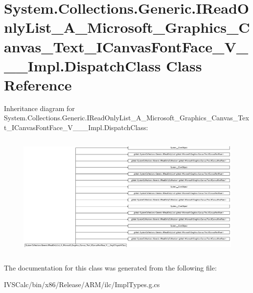 \hypertarget{class_system_1_1_collections_1_1_generic_1_1_i_read_only_list___a___microsoft___graphics___canva08bb27ae196fdbdd8fbb8b2645f26e4e}{}\section{System.\+Collections.\+Generic.\+I\+Read\+Only\+List\+\_\+\+A\+\_\+\+Microsoft\+\_\+\+Graphics\+\_\+\+Canvas\+\_\+\+Text\+\_\+\+I\+Canvas\+Font\+Face\+\_\+\+V\+\_\+\+\_\+\+\_\+\+Impl.\+Dispatch\+Class Class Reference}
\label{class_system_1_1_collections_1_1_generic_1_1_i_read_only_list___a___microsoft___graphics___canva08bb27ae196fdbdd8fbb8b2645f26e4e}
Inheritance diagram for System.\+Collections.\+Generic.\+I\+Read\+Only\+List\+\_\+\+A\+\_\+\+Microsoft\+\_\+\+Graphics\+\_\+\+Canvas\+\_\+\+Text\+\_\+\+I\+Canvas\+Font\+Face\+\_\+\+V\+\_\+\+\_\+\+\_\+\+Impl.\+Dispatch\+Class\+:\begin{figure}[H]
\begin{center}
\leavevmode
\includegraphics[height=6.213592cm]{class_system_1_1_collections_1_1_generic_1_1_i_read_only_list___a___microsoft___graphics___canva08bb27ae196fdbdd8fbb8b2645f26e4e}
\end{center}
\end{figure}


The documentation for this class was generated from the following file\+:\begin{DoxyCompactItemize}
\item 
I\+V\+S\+Calc/bin/x86/\+Release/\+A\+R\+M/ilc/Impl\+Types.\+g.\+cs\end{DoxyCompactItemize}

